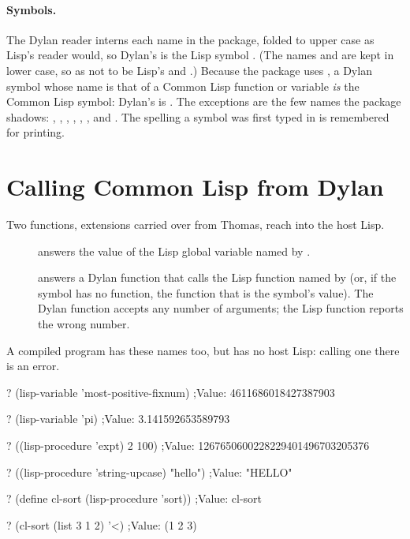 \paragraph{Symbols.} The Dylan reader interns each name in the
 package, folded to upper case as Lisp's reader would, so
Dylan's  is the Lisp symbol . (The names
 and  are kept in lower case, so as not to be Lisp's
 and .) Because the  package uses
, a Dylan symbol whose name is that of a Common Lisp
function or variable \emph{is} the Common Lisp symbol: Dylan's
 is . The exceptions are the few names the
package shadows: , , ,
, , ,  and
. The spelling a symbol was first typed in is remembered for
printing.

\section{Calling Common Lisp from Dylan}\label{sec:lisp-interop}

Two functions, extensions carried over from Thomas, reach into the
host Lisp.

\begin{description}
\item[] answers the value of the
  Lisp global variable named by .
\item[] answers a Dylan function
  that calls the Lisp function named by  (or, if the symbol
  has no function, the function that is the symbol's value). The Dylan
  function accepts any number of arguments; the Lisp function reports
  the wrong number.
\end{description}

\noindent A compiled program has these names too, but has no host Lisp:
calling one there is an error.

\begin{repl}
? (lisp-variable 'most-positive-fixnum)
;Value: 4611686018427387903

? (lisp-variable 'pi)
;Value: 3.141592653589793

? ((lisp-procedure 'expt) 2 100)
;Value: 1267650600228229401496703205376

? ((lisp-procedure 'string-upcase) "hello")
;Value: "HELLO"

? (define cl-sort (lisp-procedure 'sort))
;Value: cl-sort

? (cl-sort (list 3 1 2) '<)
;Value: (1 2 3)
\end{repl}

